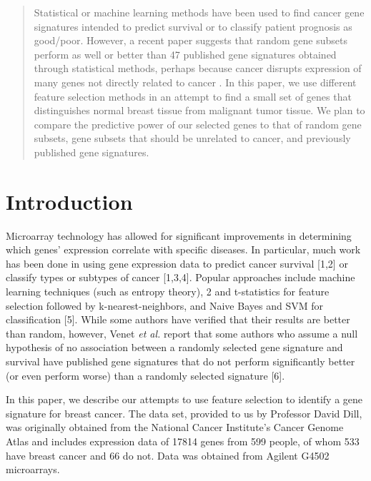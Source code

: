 \documentclass[11pt]{article}
\begin{document}
\maketitle

\begin{abstract}
Statistical or machine learning methods have been used to find cancer gene signatures intended to predict survival or to classify patient prognosis as good/poor. However, a recent paper suggests that random gene subsets perform as well or better than 47 published gene signatures obtained through statistical methods, perhaps because cancer disrupts expression of many genes not directly related to cancer \cite{venet}. In this paper, we use different feature selection methods in an attempt to find a small set of genes that distinguishes normal breast tissue from malignant tumor tissue. We plan to compare the predictive power of our selected genes to that of random gene subsets, gene subsets that should be unrelated to cancer, and previously published gene signatures.
\end{abstract}

\section{Introduction}

Microarray technology has allowed for significant improvements in determining which genes’ expression correlate with specific diseases. In particular, much work has been done in using gene expression data to predict cancer survival [1,2] or classify types or subtypes of cancer [1,3,4]. Popular approaches include machine learning techniques (such as entropy theory), 2 and t-statistics for feature selection followed by k-nearest-neighbors, and Naive Bayes and SVM for classification [5]. While some authors have verified that their results are better than random, however, Venet \emph{et al.} report that some authors who assume a null hypothesis of no association between a randomly selected gene signature and survival have published gene signatures that do not perform significantly better (or even perform worse) than a randomly selected signature [6].%

In this paper, we describe our attempts to use feature selection to identify a gene signature for breast cancer. The data set, provided to us by Professor David Dill, was originally obtained from the National Cancer Institute’s Cancer Genome Atlas and includes expression data of 17814 genes from 599 people, of whom 533 have breast cancer and 66 do not. Data was obtained from Agilent G4502 microarrays. 
\end{document}
